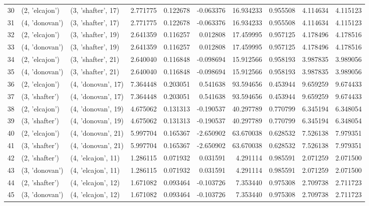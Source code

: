 \begin{tabular}{lllrrrrrrr}
30 &   (2, 'elcajon') &  (3, 'shafter', 17) &  2.771775 &  0.122678 & -0.063376 &  16.934233 &  0.955508 &  4.114634 &  4.115123 \\
31 &   (4, 'donovan') &  (3, 'shafter', 17) &  2.771775 &  0.122678 & -0.063376 &  16.934233 &  0.955508 &  4.114634 &  4.115123 \\
32 &   (2, 'elcajon') &  (3, 'shafter', 19) &  2.641359 &  0.116257 &  0.012808 &  17.459995 &  0.957125 &  4.178496 &  4.178516 \\
33 &   (4, 'donovan') &  (3, 'shafter', 19) &  2.641359 &  0.116257 &  0.012808 &  17.459995 &  0.957125 &  4.178496 &  4.178516 \\
34 &   (2, 'elcajon') &  (3, 'shafter', 21) &  2.640040 &  0.116848 & -0.098694 &  15.912566 &  0.958193 &  3.987835 &  3.989056 \\
35 &   (4, 'donovan') &  (3, 'shafter', 21) &  2.640040 &  0.116848 & -0.098694 &  15.912566 &  0.958193 &  3.987835 &  3.989056 \\
36 &   (2, 'elcajon') &  (4, 'donovan', 17) &  7.364448 &  0.203051 &  0.541638 &  93.594656 &  0.453944 &  9.659259 &  9.674433 \\
37 &   (3, 'shafter') &  (4, 'donovan', 17) &  7.364448 &  0.203051 &  0.541638 &  93.594656 &  0.453944 &  9.659259 &  9.674433 \\
38 &   (2, 'elcajon') &  (4, 'donovan', 19) &  4.675062 &  0.131313 & -0.190537 &  40.297789 &  0.770799 &  6.345194 &  6.348054 \\
39 &   (3, 'shafter') &  (4, 'donovan', 19) &  4.675062 &  0.131313 & -0.190537 &  40.297789 &  0.770799 &  6.345194 &  6.348054 \\
40 &   (2, 'elcajon') &  (4, 'donovan', 21) &  5.997704 &  0.165367 & -2.650902 &  63.670038 &  0.628532 &  7.526138 &  7.979351 \\
41 &   (3, 'shafter') &  (4, 'donovan', 21) &  5.997704 &  0.165367 & -2.650902 &  63.670038 &  0.628532 &  7.526138 &  7.979351 \\
42 &   (2, 'shafter') &  (4, 'elcajon', 11) &  1.286115 &  0.071932 &  0.031591 &   4.291114 &  0.985591 &  2.071259 &  2.071500 \\
43 &   (3, 'donovan') &  (4, 'elcajon', 11) &  1.286115 &  0.071932 &  0.031591 &   4.291114 &  0.985591 &  2.071259 &  2.071500 \\
44 &   (2, 'shafter') &  (4, 'elcajon', 12) &  1.671082 &  0.093464 & -0.103726 &   7.353440 &  0.975308 &  2.709738 &  2.711723 \\
45 &   (3, 'donovan') &  (4, 'elcajon', 12) &  1.671082 &  0.093464 & -0.103726 &   7.353440 &  0.975308 &  2.709738 &  2.711723 \\

\end{tabular}
